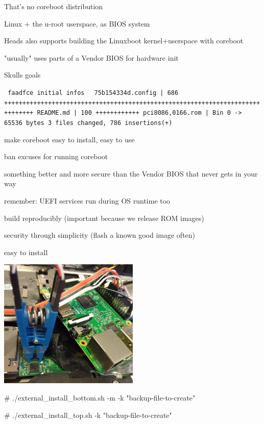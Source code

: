\documentclass[14pt]{beamer}
\begin{document}
\begin{frame}
That's no coreboot distribution
\pause

Linux + the u-root userspace, as BIOS system

Heads also supports building the Linuxboot kernel+userspace with coreboot

"usually" uses parts of a Vendor BIOS for hardware init
\end{frame}


\begin{frame}
Skulls goals
\end{frame}


\begin{frame}
\texttt{
faadfce initial infos
}
\texttt{
 75b154334d.config | 686 ++++++++++++++++++++++++++++++++++++++++++++++++++++++++++++++++++++++++++++++
 README.md         | 100 ++++++++++++
 pci8086,0166.rom  | Bin 0 -> 65536 bytes
 3 files changed, 786 insertions(+)
}
\end{frame}


\begin{frame}
make coreboot easy to install, easy to use

ban excuses for running coreboot
\pause

something better and more secure than the Vendor BIOS that never gets in your way

remember: UEFI services run during OS runtime too
\pause

build reproducibly (important because we release ROM images)

security through simplicity (flash a known good image often)
\end{frame}


\begin{frame}
easy to install
\end{frame}


\begin{frame}
\includegraphics[width=0.5\textwidth]{rpi_clip.jpg}

\# ./external\_install\_bottom.sh -m -k "backup-file-to-create"

\# ./external\_install\_top.sh -k "backup-file-to-create"
\end{frame}
\end{document}
